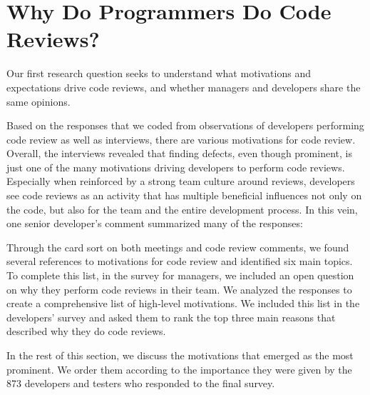 
\section{Why Do Programmers Do Code Reviews?} \label{sec:expectations}


Our first research question seeks to understand what motivations and
expectations drive code reviews, and whether managers and developers share the
same opinions.

Based on the responses that we coded from observations of developers performing
code review as well as interviews, there are various motivations for code
review. Overall, the interviews revealed that finding defects, even though
prominent, is just one of the many motivations driving developers to perform
code reviews. Especially when reinforced by a strong team culture around
reviews, developers see code reviews as an activity that has multiple
beneficial influences not only on the code, but also for the team and the
entire development process. In this vein, one senior developer's comment
summarized many of the responses: 

Through the card sort on both meetings and code review comments, we found
several references to motivations for code review and identified six main
topics. To complete this list, in the survey for managers, we included an open
question on why they perform code reviews in their team. We analyzed the
responses to create a comprehensive list of high-level motivations. We included
this list in the developers' survey and asked them to rank the top three main
reasons that described why they do code reviews.

In the rest of this section, we discuss the motivations that emerged as the
most prominent. We order them according to the importance they were given by
the 873 developers and testers who responded to the final survey.

